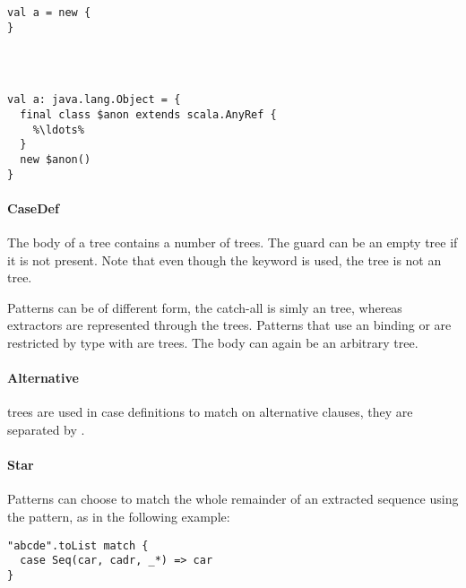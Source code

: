 \begin{multicols}{2}
\begin{lstlisting}
val a = new {
}




\end{lstlisting}
\begin{lstlisting}
val a: java.lang.Object = {
  final class $anon extends scala.AnyRef {
    %\ldots%
  }
  new $anon()
}
\end{lstlisting}
\end{multicols}

\paragraph{CaseDef} 

\noindent The body of a  tree contains a number of  trees. The guard can be an empty tree if it is not present. Note that even though the  keyword is used, the tree is not an  tree.

Patterns can be of different form, the catch-all \src{\_} is simly an  tree, whereas extractors are represented through the  trees. Patterns that use an  binding or are restricted by type with \src{:} are  trees. The body can again be an arbitrary tree.

\paragraph{Alternative} 

\noindent {} trees are used in case definitions to match on alternative clauses, they are separated by \src{|}.

\paragraph{Star} 

\noindent Patterns can choose to match the whole remainder of an extracted sequence using the \src{\_*} pattern, as in the following example:

\begin{lstlisting}
"abcde".toList match {
  case Seq(car, cadr, _*) => car 
}
\end{lstlisting}


